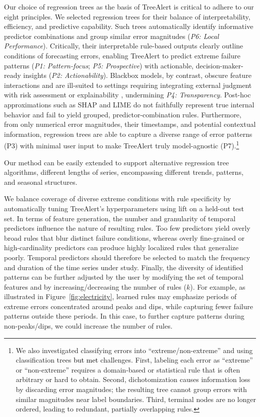 \documentclass[]{interact}
\theoremstyle{plain}
\theoremstyle{definition}
\theoremstyle{remark}
\newcommand{\galit}[1]{\textcolor{black}{#1}}
\begin{document}
Our choice of regression trees as the basis of TreeAlert is critical to adhere to our eight
principles. We selected regression trees for their balance of interpretability, efficiency,
and predictive capability. Such trees automatically identify informative predictor
combinations and group similar error magnitudes (\emph{P6: Local Performance}). Critically,
their interpretable rule-based outputs clearly outline conditions of forecasting errors,
enabling TreeAlert to predict extreme failure patterns (\emph{P1: Pattern-focus};
\emph{P5: Prospective}) with actionable, decision-maker-ready insights (\emph{P2:
Actionability}). Blackbox models, by contrast, obscure feature interactions and are
ill-suited to settings requiring integrating external judgment with risk assessment or
explainability \citep{rudin2019, houssainy2021}, undermining \emph{P4: Transparency}.
Post-hoc approximations such as SHAP and LIME do not faithfully represent true internal
behavior \citep{rudin2019} and fail to yield grouped, predictor-combination rules.
Furthermore, from only numerical error magnitudes, their timestamps, and potential contextual
information, regression trees are able to capture a diverse range of error patterns (P3)
with minimal user input to make TreeAlert truly model-agnostic (P7).\footnote{We also
investigated classifying errors into ``extreme/non-extreme'' and using classification trees
\galit{but met} challenges. First, labeling each error as ``extreme'' or ``non-extreme''
requires a domain-based or statistical rule that is often arbitrary or hard to obtain.
Second, dichotomization causes information loss by discarding error magnitudes; the resulting
tree cannot group errors with similar magnitudes near label boundaries. Third, terminal nodes
are no longer ordered, leading to redundant, partially overlapping rules.}

Our method can be easily extended to support alternative regression tree algorithms,
different lengths of series, encompassing different trends, patterns, and seasonal
structures.

We balance coverage of diverse extreme conditions with rule specificity by automatically
tuning TreeAlert's hyperparameters using lift on a held-out test set. In terms of feature
generation, the number and granularity of temporal predictors influence the nature of
resulting rules. Too few predictors yield overly broad rules that blur distinct failure
conditions, whereas overly fine-grained or high-cardinality predictors can produce highly
localized rules that generalize poorly. Temporal predictors should therefore be selected to
match the frequency and duration of the time series under study. Finally, the diversity of
identified patterns can be further adjusted by the user by modifying the set of temporal
features and by increasing/decreasing the number of rules ($k$). For example, as illustrated
in Figure~\ref{fig:electricity}, learned rules may emphasize periods of extreme errors
concentrated around peaks and dips, while capturing fewer failure patterns outside these
periods. In this case, to further capture patterns during non-peaks/dips, we could increase
the number of rules.
\end{document}
